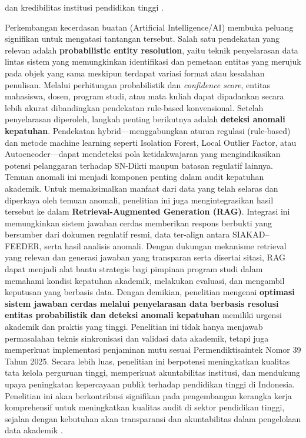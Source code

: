 \documentclass[12pt,a4paper,oneside]{report}
\begin{document}
            dan kredibilitas institusi pendidikan tinggi  \parencite{peraturan_menteri_pendidikan_tinggi__sains__dan_teknologi_tentang_penjaminan_mutu_pendidikan_tinggi_4712741f}  \parencite{rizky_tito_prasetyo_155f1543}.
        \par
            Perkembangan kecerdasan buatan (Artificial Intelligence/AI) membuka peluang signifikan untuk mengatasi tantangan tersebut. Salah satu pendekatan yang relevan adalah \textbf{probabilistic entity resolution}, yaitu teknik penyelarasan data lintas sistem yang memungkinkan identifikasi
            dan pemetaan entitas yang merujuk pada objek yang sama meskipun terdapat variasi format atau kesalahan penulisan. Melalui perhitungan probabilistik dan \textit{confidence score}, entitas mahasiswa, dosen, program studi, atau mata kuliah dapat dipadankan secara lebih akurat dibandingkan pendekatan rule-based konvensional.
            Setelah penyelarasan diperoleh, langkah penting berikutnya adalah \textbf{deteksi anomali kepatuhan}. Pendekatan hybrid—menggabungkan aturan regulasi (rule-based) dan metode machine learning seperti Isolation Forest, Local Outlier Factor, atau
            Autoencoder—dapat mendeteksi pola ketidakwajaran yang mengindikasikan potensi pelanggaran terhadap SN-Dikti maupun batasan regulatif lainnya. Temuan anomali ini menjadi komponen penting dalam audit kepatuhan akademik.
            Untuk memaksimalkan manfaat dari data yang telah selaras dan diperkaya oleh temuan anomali, penelitian ini juga mengintegrasikan hasil tersebut ke dalam \textbf{Retrieval-Augmented Generation (RAG)}. Integrasi ini memungkinkan sistem jawaban cerdas memberikan respons berbukti yang bersumber dari dokumen regulatif resmi, data ter-align antara SIAKAD–FEEDER, serta hasil analisis anomali.
            Dengan dukungan mekanisme retrieval yang relevan dan generasi jawaban yang transparan serta disertai sitasi, RAG dapat menjadi alat bantu strategis bagi pimpinan program studi dalam memahami kondisi kepatuhan akademik, melakukan evaluasi, dan mengambil keputusan yang berbasis data.
            Dengan demikian, penelitian mengenai \textbf{optimasi sistem jawaban cerdas melalui penyelarasan data berbasis resolusi entitas probabilistik dan deteksi anomali kepatuhan} memiliki urgensi akademik dan praktis yang tinggi. Penelitian ini tidak hanya menjawab permasalahan teknis sinkronisasi dan validasi data akademik,
            tetapi juga memperkuat implementasi penjaminan mutu sesuai Permendiktisaintek Nomor 39 Tahun 2025. Secara lebih luas, penelitian ini berpotensi meningkatkan kualitas tata kelola perguruan tinggi, memperkuat akuntabilitas institusi, dan mendukung upaya peningkatan kepercayaan publik terhadap pendidikan tinggi di Indonesia.
            Penelitian ini akan berkontribusi signifikan pada pengembangan kerangka kerja komprehensif untuk meningkatkan kualitas audit di sektor pendidikan tinggi, sejalan dengan kebutuhan akan transparansi dan akuntabilitas dalam pengelolaan data akademik  \parencite{sasmita_trimoelya_kau_f43471f6}  \parencite{tangguh_sang_putro_918140e5}.
\end{document}
